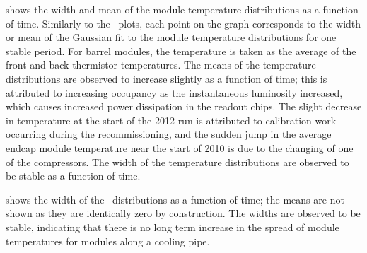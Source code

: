  shows the width and mean of the module temperature
distributions as a function of time. Similarly to the \deltat\ plots, each point
on the graph corresponds to the width or mean of the Gaussian fit to the module
temperature distributions for one stable period. For barrel modules, the
temperature is taken as the average of the front and back thermistor
temperatures. The means of the temperature distributions are observed to increase
slightly as a function of time; this is attributed to increasing occupancy as
the instantaneous luminosity increased, which causes increased power dissipation
in the readout chips. The slight decrease in temperature at the start of the
2012 run is attributed to calibration work occurring during the recommissioning,
and the sudden jump in the average endcap module temperature near the start of
2010 is due to the changing of one of the compressors.  The width of the
temperature distributions are observed to be
stable as a function of time.

 shows the width of the \tdiff\
distributions as a function of time; the means are not shown as they are
identically zero by construction. The widths are observed to be stable, indicating
that there is no long term increase in the spread of module temperatures for
modules along a cooling pipe.

